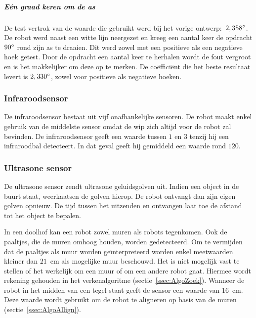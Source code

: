 \documentclass[eind]{penoverslag}
\begin{document}

\subparagraph{E\'en graad keren om de as}
De test vertrok van de waarde die gebruikt werd bij het vorige ontwerp:~$2,358\degree$. De robot werd naast een witte lijn neergezet en kreeg een aantal keer de opdracht $90\degree$ rond zijn as te draaien. Dit werd zowel met een positieve als een negatieve hoek getest. Door de opdracht een aantal keer te herhalen wordt de fout vergroot en is het makkelijker om deze op te merken.
De co\"effici\"ent die het beste resultaat levert is $2,330\degree$, zowel voor positieve als negatieve hoeken.



\subsubsection{Infraroodsensor}
De infraroodsensor bestaat uit vijf onafhankelijke sensoren. De robot maakt enkel gebruik van de middelste sensor omdat de wip zich altijd voor de robot zal bevinden. De infraroodsensor geeft een waarde tussen $1$ en $3$ tenzij hij een infraroodbal detecteert. In dat geval geeft hij gemiddeld een waarde rond $120$.

\subsubsection{Ultrasone sensor}
De ultrasone sensor zendt ultrasone geluidsgolven uit. Indien een object in de buurt staat, weerkaatsen de golven hierop. De robot ontvangt dan zijn eigen golven opnieuw. De tijd tussen het uitzenden en ontvangen laat toe de afstand tot het object te bepalen.

In een doolhof kan een robot zowel muren als robots tegenkomen. Ook de paaltjes, die de muren omhoog houden, worden gedetecteerd. Om te vermijden dat de paaltjes als muur worden ge\"interpreteerd worden enkel meetwaarden kleiner dan $21$~cm als mogelijke muur beschouwd. Het is niet mogelijk vast te stellen of het werkelijk om een muur of om een andere robot gaat. Hiermee wordt rekening gehouden in het verkenalgoritme (sectie~\ref{ssec:AlgoZoek}). Wanneer de robot in het midden van een tegel staat geeft de sensor een waarde van $16$~cm. Deze waarde wordt gebruikt om de robot te aligneren op basis van de muren (sectie~\ref{ssec:AlgoAllign}).
\end{document}
